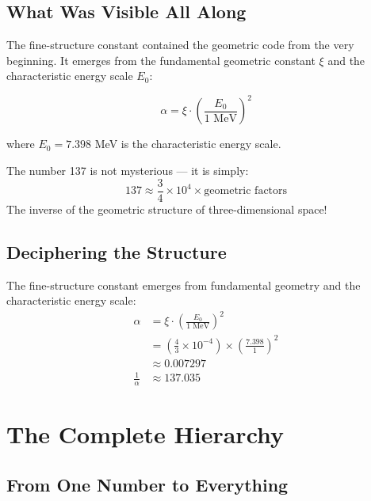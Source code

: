 	\subsection{What Was Visible All Along}
	
	The fine-structure constant contained the geometric code from the very beginning. It emerges from the fundamental geometric constant $\xi$ and the characteristic energy scale $E_0$:
	
	\begin{equation}
		\alpha = \xi \cdot \left(\frac{E_0}{1 \text{ MeV}}\right)^2
	\end{equation}
	
	where $E_0 = 7.398$ MeV is the characteristic energy scale.
	
	\begin{tcolorbox}[colback=blue!5!white,colframe=blue!75!black,title=Insight]
		The number 137 is not mysterious — it is simply:
		\begin{equation}
			137 \approx \frac{3}{4} \times 10^4 \times \text{geometric factors}
		\end{equation}
		The inverse of the geometric structure of three-dimensional space!
	\end{tcolorbox}
	
	\subsection{Deciphering the Structure}
	
	\begin{tcolorbox}[colback=red!5!white,colframe=red!75!black,title=The Complete Deciphering]
		The fine-structure constant emerges from fundamental geometry and the characteristic energy scale:
		\begin{align}
			\alpha &= \xi \cdot \left(\frac{E_0}{1 \text{ MeV}}\right)^2 \\
			&= \left(\frac{4}{3} \times 10^{-4}\right) \times \left(\frac{7.398}{1}\right)^2 \\
			&\approx 0.007297 \\
			\frac{1}{\alpha} &\approx 137.035
		\end{align}
	\end{tcolorbox}
	
	\section{The Complete Hierarchy}
	
	\subsection{From One Number to Everything}
	
